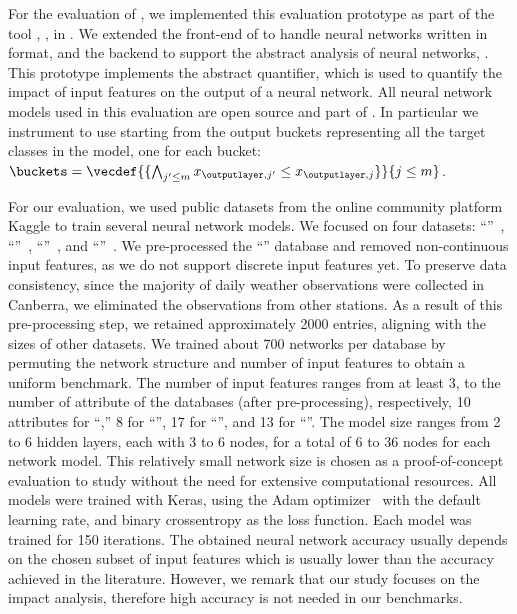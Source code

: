 For the evaluation of \changesname, we implemented this evaluation prototype as part of the tool \impatto\sidenote{\impattourl}, \cf{} , in \python{}.
We extended the front-end of \impatto{} to handle neural networks written in \python{} format, and the backend to support the abstract analysis of neural networks, \cf{} . This prototype implements the \abstractchangesname{} abstract quantifier, which is used to quantify the impact of input features on the output of a neural network. All neural network models used in this evaluation are open source and part of \impatto.
In particular we instrument \impatto{} to use \abstractchangesname{} starting from the output buckets representing all the target classes in the model, one for each bucket: $\buckets = \vecdef{\{\bigwedge_{j'\le m} x_{\outputlayer, j'}\le x_{\outputlayer, j}\}}{j\le m}$.


For our evaluation, we used public datasets from the online community platform Kaggle to train several neural network models.
We focused on four datasets: ``\wine''~, ``\diabetes''~, ``\rain''~, and ``\princess''~.
We pre-processed the ``\rain'' database and removed non-continuous input features, as we do not support discrete input features yet.
To preserve data consistency, since the majority of daily weather observations were collected in Canberra, we eliminated the observations from other stations.
As a result of this pre-processing step, we retained approximately 2000 entries, aligning with the sizes of other datasets.
We trained about 700 networks per database by permuting the network structure and number of input features to obtain a uniform benchmark.
The number of input features ranges from at least 3, to the number of attribute of the databases (after pre-processing),
respectively, 10 attributes for ``\wine,'' 8 for ``\diabetes'', 17 for ``\rain'', and 13 for ``\princess''.
The model size ranges from 2 to 6 hidden layers, each with 3 to 6 nodes, for a total of 6 to 36 nodes for each network model.
This relatively small network size is chosen as a proof-of-concept evaluation to study \changesname{} without the need for extensive computational resources.
All models were trained with Keras, using the Adam optimizer~ with the default learning rate, and binary crossentropy as the loss function. Each model was trained for 150 iterations.
The obtained neural network accuracy usually depends on the chosen subset of input features which is usually lower than the accuracy achieved in the literature.
However, we remark that our study focuses on the impact analysis, therefore high accuracy is not needed in our benchmarks.

